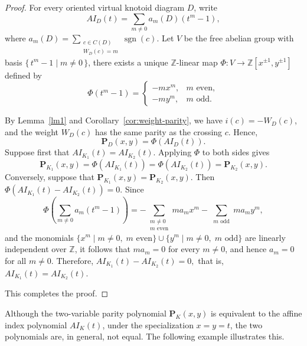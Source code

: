 \documentclass[10pt,a4paper]{amsart}
\numberwithin{equation}{section}
\numberwithin{equation}{section}
\begin{document}
\begin{proof}
	For every oriented virtual knotoid diagram $D$, write
	\[
	AI_D(t)=
	\sum_{m\neq0}
	a_m(D)(t^m-1),
	\]
	where
	$
	a_m(D)=
	\sum_{\substack{c\in C(D)\\W_D(c)=m}}
	\operatorname{sgn}(c).
	$
	Let $V$ be the free abelian group with basis
	$\{\,t^m-1\mid m\neq0\,\}$, there exists a unique
	$\mathbb Z$-linear map
	$
	\Phi:V\longrightarrow
	\mathbb Z[x^{\pm1},y^{\pm1}]
	$
	defined by
	\[
	\Phi(t^m-1)=
	\begin{cases}
		-mx^m,&m\text{ even},\\[1ex]
		-my^m,&m\text{ odd}.
	\end{cases}
	\]
	
	By Lemma~\ref{lm1} and Corollary~\ref{cor:weight-parity}, we have
	$i(c)=-W_D(c)$, and the weight $W_D(c)$ has the same parity as the crossing $c$.
	Hence,
	\begin{equation} \label{equ6}
		\mathbf P_D(x,y)
		=
		\Phi(AI_D(t)).	
	\end{equation}
	Suppose first that
	$
	AI_{K_1}(t)=AI_{K_2}(t).
	$
	Applying $\Phi$ to both sides gives
	\[
	\mathbf P_{K_1}(x,y)
	=
	\Phi(AI_{K_1}(t))
	=
	\Phi(AI_{K_2}(t))
	=
	\mathbf P_{K_2}(x,y).
	\]
	Conversely, suppose that
	$
	\mathbf P_{K_1}(x,y)
	=
	\mathbf P_{K_2}(x,y).
	$
	Then
	$
	\Phi\!\left(
	AI_{K_1}(t)-AI_{K_2}(t)
	\right)=0.
	$
	Since
	\[
	\Phi\!\left(
	\sum_{m\neq0}a_m(t^m-1)
	\right)
	=
	-\sum_{\substack{m\neq0\\m\text{ even}}}
	ma_mx^m
	-
	\sum_{\substack{m\text{ odd}}}
	ma_my^m,
	\]
	and the monomials
	$
	\{x^m\mid m\neq0,\;m\text{ even}\}
	\cup
	\{y^m\mid m\neq0,\;m\text{ odd}\}
	$
	are linearly independent over $\mathbb Z$, it follows that
	$ma_m=0$ for every $m\neq0$, and hence $a_m=0$ for all $m\neq0$.
	Therefore,
	$
	AI_{K_1}(t)-AI_{K_2}(t)=0,
	$
	that is,
	$
	AI_{K_1}(t)=AI_{K_2}(t).
	$
	
	This completes the proof.	
\end{proof}


Although the two-variable parity polynomial $\mathbf{P}_K(x,y)$ is equivalent to the affine index polynomial $AI_K(t)$, under the specialization $x=y=t$, the two polynomials are, in general, not equal. The following example illustrates this.
\end{document}
